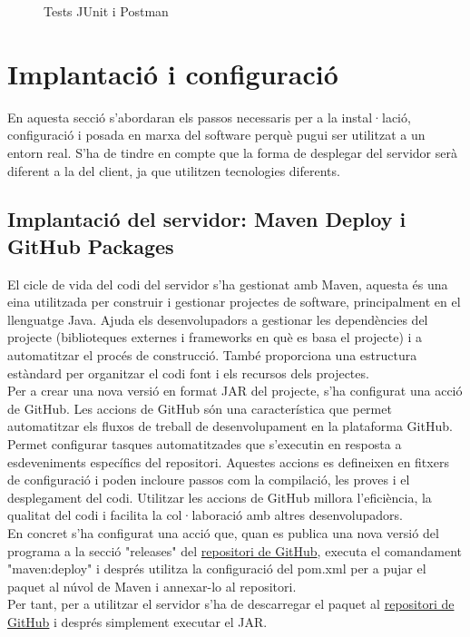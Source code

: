 \begin{figure}[H]
\begin{subfigure}[h]{0.35\textwidth}
         \label{fig:Registre}
     \end{subfigure}
        \caption{Tests JUnit i Postman}
        \label{fig:Tests JUnit i Postman}
\end{figure}
\section{Implantació i configuració}
En aquesta secció s'abordaran els passos necessaris per a la instal·lació, configuració i posada en marxa del software perquè pugui ser utilitzat a un entorn real. S'ha de tindre en compte que la forma de desplegar del servidor serà diferent a la del client, ja que utilitzen tecnologies diferents.
\subsection{Implantació del servidor: Maven Deploy i GitHub Packages}
El cicle de vida del codi del servidor s'ha gestionat amb Maven, aquesta és una eina utilitzada per construir i gestionar projectes de software, principalment en el llenguatge Java. Ajuda els desenvolupadors a gestionar les dependències del projecte (biblioteques externes i frameworks en què es basa el projecte) i a automatitzar el procés de construcció. També proporciona una estructura estàndard per organitzar el codi font i els recursos dels projectes.
\\[3mm]
Per a crear una nova versió en format JAR del projecte, s'ha configurat una acció de GitHub. Les accions de GitHub són una característica que permet automatitzar els fluxos de treball de desenvolupament en la plataforma GitHub. Permet configurar tasques automatitzades que s'executin en resposta a esdeveniments específics del repositori. Aquestes accions es defineixen en fitxers de configuració i poden incloure passos com la compilació, les proves i el desplegament del codi. Utilitzar les accions de GitHub millora l'eficiència, la qualitat del codi i facilita la col·laboració amb altres desenvolupadors.
\\[3mm]
En concret s'ha configurat una acció que, quan es publica una nova versió del programa a la secció "releases" del \href{https://github.com/VictoRPiles/escacs}{repositori de GitHub}, executa el comandament "maven:deploy" i després utilitza la configuració del pom.xml per a pujar el paquet al núvol de Maven i annexar-lo al repositori.
\\[3mm]
Per tant, per a utilitzar el servidor s'ha de descarregar el paquet al \href{https://github.com/VictoRPiles/escacs}{repositori de GitHub} i després simplement executar el JAR.
